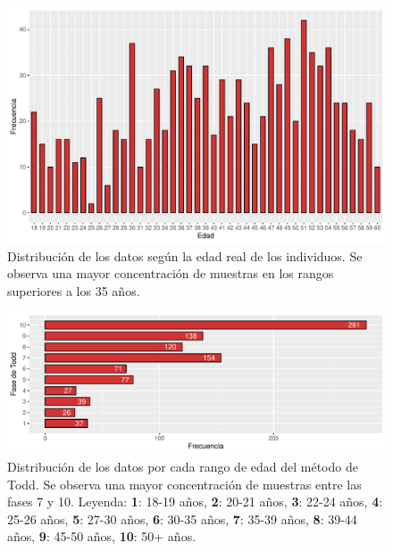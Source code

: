 \begin{figure}[h]
    \centering
    \includegraphics[width=\linewidth]{../../scripts/eda/eda_univar/char_age_distr.pdf}
    \caption[Distribución de los datos por edad]{Distribución de los datos según la edad real de los individuos. Se observa una mayor concentración de muestras en los rangos superiores a los 35 años.}
    \label{fig4:age}
\end{figure}
\begin{figure}[h]
    \centering
    \includegraphics[width=\linewidth]{../../scripts/eda/eda_univar/char_t_phase_distr.pdf}
    \caption[Distribución de los datos por cada rango de edad]{Distribución de los datos por cada rango de edad del método de Todd. Se observa una mayor concentración de muestras entre las fases 7 y 10. Leyenda: \textbf{1}: 18-19 años, \textbf{2}: 20-21 años, \textbf{3}: 22-24 años, \textbf{4}: 25-26 años, \textbf{5}: 27-30 años, \textbf{6}: 30-35 años, \textbf{7}: 35-39 años, \textbf{8}: 39-44 años, \textbf{9}: 45-50 años, \textbf{10}: 50+ años.}
    \label{fig4:todd_phase}
\end{figure}

